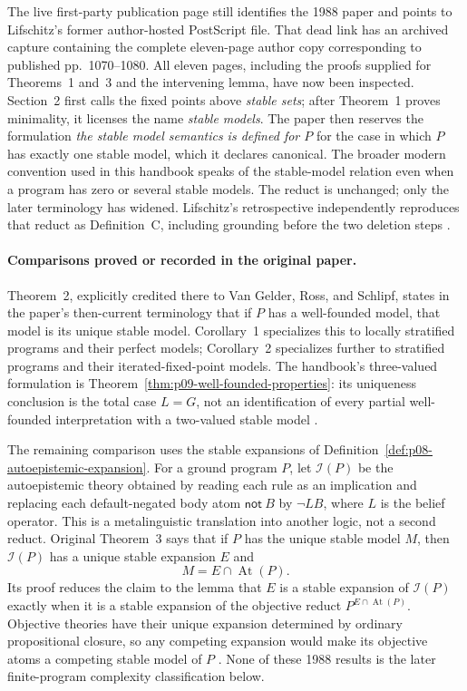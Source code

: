 The live first-party publication page still identifies the 1988 paper and
points to Lifschitz's former author-hosted PostScript file.  That dead link has
an archived capture containing the complete eleven-page author copy
corresponding to published pp.~1070--1080.  All eleven pages, including the
proofs supplied for
Theorems~1 and~3 and the intervening lemma, have now been inspected.
Section~2 first calls the fixed points above \emph{stable
sets}; after Theorem~1 proves minimality, it licenses the name \emph{stable
models}.  The paper then reserves the formulation \emph{the stable model
semantics is defined for \(P\)} for the case in which \(P\) has exactly one
stable model, which it declares canonical.  The broader modern convention used
in this handbook speaks of the stable-model relation even when a program has
zero or several stable models.  The reduct is unchanged; only the later
terminology has widened.  Lifschitz's retrospective independently reproduces
that reduct as Definition~C, including grounding before the two deletion steps
\cite[\S5, p.~43]{Lifschitz2008TwelveDefinitions}.

\paragraph{Comparisons proved or recorded in the original paper.}
Theorem~2, explicitly credited there to Van Gelder, Ross, and Schlipf, states
in the paper's then-current terminology that if \(P\) has a well-founded model,
that model is its unique stable model.  Corollary~1 specializes this to locally
stratified programs and their perfect models; Corollary~2 specializes further
to stratified programs and their iterated-fixed-point models.  The handbook's
three-valued formulation is
Theorem~\ref{thm:p09-well-founded-properties}: its uniqueness conclusion is
the total case \(L=G\), not an identification of every partial well-founded
interpretation with a two-valued stable model
\cite[\S4, thm.~2 and cors.~1--2]{GelfondLifschitz1988}.

The remaining comparison uses the stable expansions of
Definition~\ref{def:p08-autoepistemic-expansion}.  For a ground program \(P\),
let \(\mathcal I(P)\) be the autoepistemic theory obtained by reading each rule
as an implication and replacing each default-negated body atom
\(\mathsf{not}\ B\) by \(\neg L B\), where \(L\) is the belief operator.
This is a metalinguistic translation into another logic, not a second reduct.
Original Theorem~3 says that if \(P\) has the unique stable model \(M\), then
\(\mathcal I(P)\) has a unique stable expansion \(E\) and
\[
 M=E\cap\operatorname{At}(P).
\]
Its proof reduces the claim to the lemma that \(E\) is a stable expansion of
\(\mathcal I(P)\) exactly when it is a stable expansion of the objective
reduct \(P^{E\cap\operatorname{At}(P)}\).  Objective theories have their unique
expansion determined by ordinary propositional closure, so any competing
expansion would make its objective atoms a competing stable model of \(P\)
\cite[\S4, thm.~3]{GelfondLifschitz1988}.  None of these 1988
results is the later finite-program complexity classification below.

